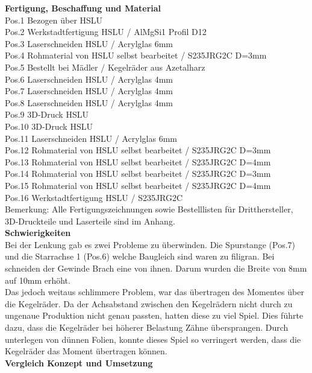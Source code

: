 \newpage
\textbf{Fertigung, Beschaffung und Material}\\[0.2cm]
Pos.1 	Bezogen über HSLU\\
Pos.2 	Werkstadtfertigung HSLU / AlMgSi1 Profil D12\\
Pos.3 	Laserschneiden HSLU / Acrylglas 6mm\\
Pos.4 	Rohmaterial von HSLU selbst bearbeitet / S235JRG2C D=3mm\\
Pos.5 	Bestellt bei Mädler / Kegelräder aus Azetalharz\\
Pos.6 	Laserschneiden HSLU / Acrylglas 4mm\\
Pos.7 	Laserschneiden HSLU / Acrylglas 4mm\\
Pos.8	Laserschneiden HSLU / Acrylglas 4mm\\
Pos.9 	3D-Druck HSLU\\
Pos.10	3D-Druck HSLU\\
Pos.11	Laserschneiden HSLU / Acrylglas 6mm\\
Pos.12	Rohmaterial von HSLU selbst bearbeitet / S235JRG2C D=3mm\\
Pos.13	Rohmaterial von HSLU selbst bearbeitet / S235JRG2C D=4mm\\
Pos.14	Rohmaterial von HSLU selbst bearbeitet / S235JRG2C D=3mm\\
Pos.15	Rohmaterial von HSLU selbst bearbeitet / S235JRG2C D=4mm\\
Pos.16	Werkstadtfertigung HSLU / S235JRG2C\\
Bemerkung: Alle Fertigungszeichnungen sowie Bestelllisten für Dritthersteller, 3D-Druckteile und Laserteile sind im Anhang.\\[0.2cm]
\textbf{Schwierigkeiten}\\[0.2cm]
Bei der Lenkung gab es zwei Probleme zu überwinden. Die Spurstange (Pos.7) und die Starrachse 1 (Pos.6) welche Baugleich sind waren zu filigran. Bei schneiden der Gewinde Brach eine von ihnen. Darum wurden die Breite von 8mm auf 10mm erhöht.\\
Das jedoch weitaus schlimmere Problem, war das übertragen des Momentes über die Kegelräder. Da der Achsabstand zwischen den Kegelrädern nicht durch zu ungenaue Produktion nicht genau passten, hatten diese zu viel Spiel. Dies führte dazu, dass die Kegelräder bei höherer Belastung Zähne übersprangen. Durch unterlegen von dünnen Folien, konnte dieses Spiel so verringert werden, dass die Kegelräder das Moment übertragen können.\\[0.2cm] 
\textbf{Vergleich Konzept und Umsetzung}\\[0.2cm]
